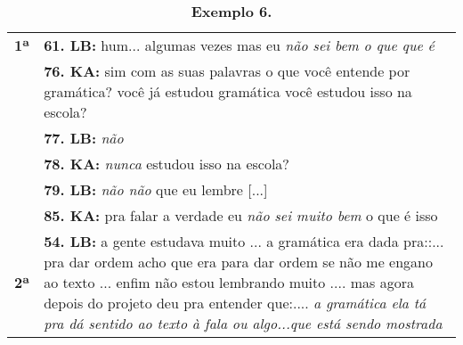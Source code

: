 \begin{table}[!t] %
	\centering
	\small
	\begin{threeparttable}
		\caption*{\textbf{Exemplo 6.}}
		\label{tab-07}
		\begin{tabular}{@{} 
				>{\raggedright\arraybackslash}p{} 
				>{\raggedright\arraybackslash}p{} @{}}
			\toprule\noalign{}
			\multirow{2}{*}{Luiza Bairros: compreensão de gramática} \linebreak
			\\
			\midrule\noalign{}
			
			\noalign{}
			
			
			\textbf{1ª} & \textbf{61. LB: }hum... algumas vezes mas eu \emph{não sei bem o que que é} \\
			
			& \textbf{76. KA: }sim com as suas palavras o que você entende por gramática? você já estudou gramática você estudou isso na escola? \\
			
			& \textbf{77. LB: }\emph{não} \\
			
			& \textbf{78. KA: }\emph{nunca} estudou isso na escola? \\
			
			& \textbf{79. LB:} \emph{não não} que eu lembre {[}...{]} \\
			
			& \textbf{85. KA:} pra falar a verdade eu \emph{não sei muito bem} o que é isso \\
            \midrule
			
			\textbf{2ª } & \textbf{54. LB:} a gente estudava muito ... a gramática era dada pra::... pra dar ordem acho que era para dar ordem se não me engano ao texto ... enfim não estou lembrando muito .... mas agora depois do projeto deu pra entender que:.... \emph{a gramática ela tá pra dá sentido ao texto à fala ou algo...que está sendo mostrada} \\
			\bottomrule
		\end{tabular}
	\end{threeparttable}
\end{table}
